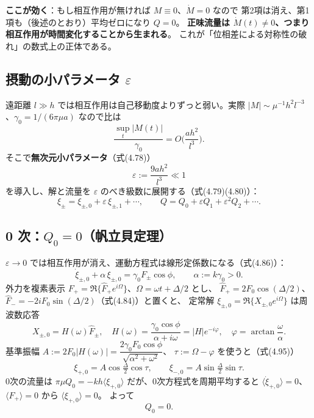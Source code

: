 \documentclass[11pt,a4paper]{article}
\newcommand{\gamz}{\gamma_{0}}
\begin{document}
\begin{keybox}
\textbf{ここが効く}：もし相互作用が無ければ $M\equiv0$、$\dot M=0$ なので
第2項は消え、第1項も（後述のとおり）平均ゼロになり $Q=0$。
\textbf{正味流量は $\dot M(t)\neq0$、つまり相互作用が時間変化することから生まれる}。
これが「位相差による対称性の破れ」の数式上の正体である。
\end{keybox}

\subsection{摂動の小パラメータ $\varepsilon$}

遠距離 $l\gg h$ では相互作用は自己移動度よりずっと弱い。実際
$|M|\sim\mu^{-1}h^2 l^{-3}$、$\gamz=1/(6\pi\mu a)$ なので比は
\begin{equation}
\frac{\sup_t|M(t)|}{\gamz}=O\!\Big(\frac{a h^2}{l^3}\Big).
\end{equation}
そこで\textbf{無次元小パラメータ}（式(4.78)）
\begin{equation}
\varepsilon:=\frac{9 a h^2}{l^3}\ll1
\end{equation}
を導入し、解と流量を $\varepsilon$ のべき級数に展開する（式(4.79)(4.80)）：
\begin{equation}
\xi_\pm=\xi_{\pm,0}+\varepsilon\,\xi_{\pm,1}+\cdots,\qquad
Q=Q_0+\varepsilon Q_1+\varepsilon^2 Q_2+\cdots.
\end{equation}

\subsection{0 次：$Q_0=0$（帆立貝定理）}

$\varepsilon\to0$ では相互作用が消え、運動方程式は線形定係数になる（式(4.86)）：
\begin{equation}
\dot\xi_{\pm,0}+\alpha\,\xi_{\pm,0}=\gamz F_\pm\cos\phi,\qquad \alpha:=k\gamz>0.
\end{equation}
外力を複素表示 $F_+=\Re\{\hat F_+e^{i\Omega}\}$、$\Omega=\omega t+\Delta/2$ とし、
$\hat F_+=2F_0\cos(\Delta/2)$、$\hat F_-=-2iF_0\sin(\Delta/2)$（式(4.84)）と置くと、
定常解 $\xi_{\pm,0}=\Re\{X_{\pm,0}e^{i\Omega}\}$ は周波数応答
\begin{equation}
X_{\pm,0}=H(\omega)\hat F_\pm,\quad H(\omega)=\frac{\gamz\cos\phi}{\alpha+i\omega}
=|H|e^{-i\varphi},\quad \varphi=\arctan\frac{\omega}{\alpha}.
\end{equation}
基準振幅 $A:=2F_0|H(\omega)|=\dfrac{2\gamz F_0\cos\phi}{\sqrt{\alpha^2+\omega^2}}$、
$\tau:=\Omega-\varphi$ を使うと（式(4.95)）
\begin{equation}
\xi_{+,0}=A\cos\tfrac{\Delta}{2}\cos\tau,\qquad
\xi_{-,0}=A\sin\tfrac{\Delta}{2}\sin\tau.
\end{equation}
0次の流量は $\pi\mu Q_0=-kh\langle\xi_{+,0}\rangle$ だが、0次方程式を周期平均すると
$\langle\dot\xi_{+,0}\rangle=0$、$\langle F_+\rangle=0$ から $\langle\xi_{+,0}\rangle=0$。
よって
\begin{equation}
\boxed{\,Q_0=0.\,}
\end{equation}
\end{document}
